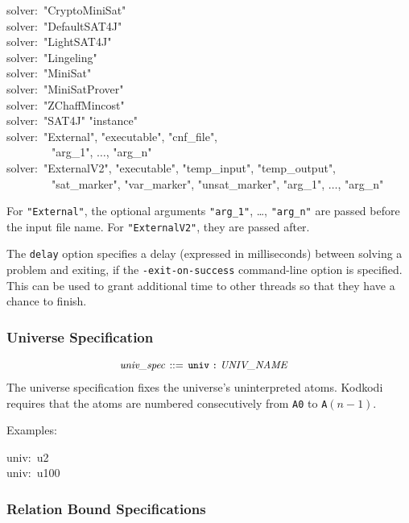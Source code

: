 \documentclass[a4paper,12pt]{article}
\begin{document}
    \pre
    \ttfamily\small
    solver:~"CryptoMiniSat" \\
    solver:~"DefaultSAT4J" \\
    solver:~"LightSAT4J" \\
    solver:~"Lingeling" \\
    solver:~"MiniSat" \\
    solver:~"MiniSatProver" \\
    solver:~"ZChaffMincost" \\
    solver:~"SAT4J" "instance" \\
    solver:~"External", "executable", "cnf\_file", \\
    ~~~~~~~~"arg\_1", $\ldots$, "arg\_n" \\
    solver:~"ExternalV2", "executable", "temp\_input", "temp\_output", \\
    ~~~~~~~~"sat\_marker", "var\_marker", "unsat\_marker", "arg\_1", $\ldots$, "arg\_n"
    \post

    For \verb|"External"|, the optional arguments \verb|"arg_1"|, \ldots,
    \verb|"arg_n"| are passed before the input file name. For \verb|"ExternalV2"|,
    they are passed after.

    The \verb|delay| option specifies a delay (expressed in milliseconds) between
    solving a problem and exiting, if the \verb|-exit-on-success| command-line
    option is specified. This can be used to grant additional time to other threads
    so that they have a chance to finish.

    \subsubsection{Universe Specification}
    \label{universe-specification}

    $$\small\begin{aligned}
                \textit{univ\_spec} \,::=\, {} & \verb|univ|\; \verb|:|\; \textit{UNIV\_NAME}
    \end{aligned}$$
%
    The universe specification fixes the universe's uninterpreted atoms. Kodkodi
    requires that the atoms are numbered consecutively from \texttt{A0} to
    \texttt{A}$(n - 1)$.

    Examples:

    \pre
    \ttfamily\small
    univ:~u2 \\
    univ:~u100
    \post

    \subsubsection{Relation Bound Specifications}
    \label{relation-bound-specifications}
\end{document}
